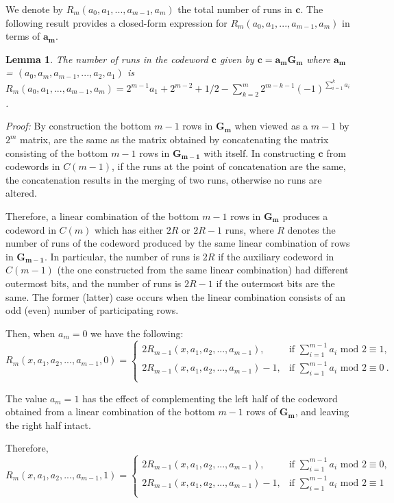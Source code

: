 \documentclass[12pt]{article} \pagestyle{plain} \topmargin
\newtheorem{lemma}{Lemma}
\begin{document}
We denote by $R_m(a_0,a_1,...,a_{m-1},a_m)$ the total number of runs
in $\mathbf{c}$. The following result provides a closed-form
expression for $R_m(a_0,a_1,...,a_{m-1},a_m)$ in terms of
$\mathbf{a_m}$.

\begin{lemma} The number of runs in the codeword $\mathbf{c}$
given by $\mathbf{c}=\mathbf{a_mG_m}$ where $\mathbf{a_m}$ =
$(a_0,a_m,a_{m-1},...,a_2,a_1)$ is
$R_m(a_0,a_1,...,a_{m-1},a_m)=2^{m-1}a_1+2^{m-2}+1/2-\sum_{k=2}^m
2^{m-k-1}(-1)^{\sum_{i=1}^ka_i}$.
\end{lemma}
\noindent \textit{Proof:} By construction the bottom $m-1$ rows in
$\mathbf{G_m}$ when viewed as a $m-1$ by $2^m$ matrix, are the same
as the matrix obtained by concatenating the matrix consisting of the
bottom $m-1$ rows in $\mathbf{G_{m-1}}$ with itself. In constructing
$\mathbf{c}$ from codewords in $C(m-1)$, if the runs at the point of
concatenation are the same, the concatenation results in the merging
of two runs, otherwise no runs are altered.

Therefore, a linear combination of the bottom $m-1$ rows in
$\mathbf{G_m}$ produces a codeword in $C(m)$ which has either $2R$
or $2R-1$ runs, where $R$ denotes the number of runs of the codeword
produced by the same linear combination of rows in
$\mathbf{G_{m-1}}$. In particular, the number of runs is $2R$ if the
auxiliary codeword in $C(m-1)$ (the one constructed from the same
linear combination) had different outermost bits, and the number of
runs is $2R-1$ if the outermost bits are the same. The former
(latter) case occurs when the linear combination consists of an odd
(even) number of participating rows.


Then, when $a_m=0$ we have the following:
\[ R_m(x,a_1,a_2,...,a_{m-1},0)=\left\{
\begin{array}{ll}
    2R_{m-1}(x,a_1,a_2,...,a_{m-1}), & \text{if $\sum_{i=1}^{m-1} a_i$ mod $2 \equiv 1$,}\\
    2R_{m-1}(x,a_1,a_2,...,a_{m-1})-1, & \text{if $\sum_{i=1}^{m-1} a_i$ mod $2 \equiv 0$}~.\\
\end{array}
\right. \]

The value $a_m=1$ has the effect of complementing the left half of
the codeword obtained from a linear combination of the bottom $m-1$
rows of $\mathbf{G_m}$, and leaving the right half intact.

Therefore,
\[ R_m(x,a_1,a_2,...,a_{m-1},1)=\left\{
\begin{array}{ll}
    2R_{m-1}(x,a_1,a_2,...,a_{m-1}), & \text{if $\sum_{i=1}^{m-1} a_i$ mod $2 \equiv 0$,}\\
    2R_{m-1}(x,a_1,a_2,...,a_{m-1})-1, & \text{if $\sum_{i=1}^{m-1} a_i$ mod $2 \equiv 1$}\\
\end{array}
\right. \]
\end{document}
